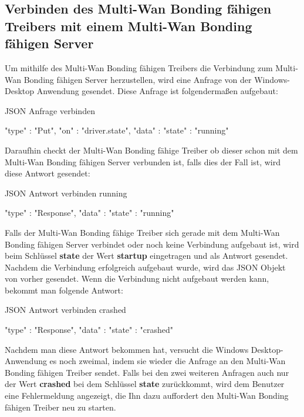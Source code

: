 \subsection{Verbinden des Multi-Wan Bonding fähigen Treibers mit einem Multi-Wan Bonding fähigen Server}
Um mithilfe des Multi-Wan Bonding fähigen Treibers die Verbindung zum Multi-Wan Bonding fähigen Server herzustellen, wird eine Anfrage von der Windows-Desktop Anwendung gesendet. Diese Anfrage ist folgendermaßen aufgebaut:
\begin{program}[H]
\caption{JSON Anfrage verbinden}
\begin{GenericCode}
    {
        "type" :  "Put",
        "on" :  "driver.state",
        "data" : {"state" : "running"} 
    }    
\end{GenericCode}
\end{program}
\noindent
Daraufhin checkt der Multi-Wan Bonding fähige Treiber ob dieser schon mit dem Multi-Wan Bonding fähigen Server verbunden ist, falls dies der Fall ist, wird diese Antwort gesendet:
\begin{program}[H]
\caption{JSON Antwort verbinden running}
\begin{GenericCode}
    {
        "type" :  "Response",
        "data" : {"state" : "running"} 
    }    
\end{GenericCode}
\end{program}
\noindent
Falls der Multi-Wan Bonding fähige Treiber sich gerade mit dem Multi-Wan Bonding fähigen Server verbindet oder noch keine Verbindung aufgebaut ist, wird beim Schlüssel \textbf{state} der Wert \textbf{startup} eingetragen und als Antwort gesendet. Nachdem die Verbindung erfolgreich aufgebaut wurde, wird das JSON Objekt von vorher gesendet. Wenn die Verbindung nicht aufgebaut werden kann, bekommt man folgende Antwort:
\begin{program}[H]
\caption{JSON Antwort verbinden crashed}
\begin{GenericCode}
    {
        "type" :  "Response",
        "data" : {"state" : "crashed"} 
    }    
\end{GenericCode}
\end{program}
\newpage
\noindent
Nachdem man diese Antwort bekommen hat, versucht die Windows Desktop-Anwendung es noch zweimal, indem sie wieder die Anfrage an den Multi-Wan Bonding fähigen Treiber sendet. Falls bei den zwei weiteren Anfragen auch nur der Wert \textbf{crashed} bei dem Schlüssel \textbf{state} zurückkommt, wird dem Benutzer eine Fehlermeldung angezeigt, die Ihn dazu auffordert den Multi-Wan Bonding fähigen Treiber neu zu starten.


